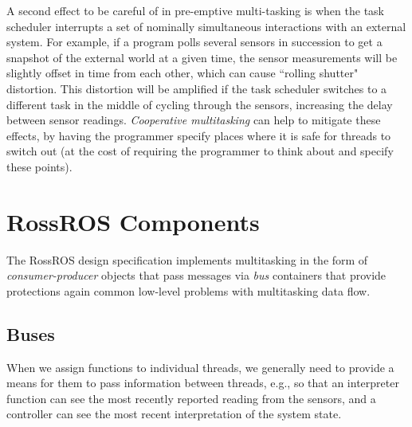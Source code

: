 \documentclass[11pt]{article}
\begin{document}
A second effect to be careful of in pre-emptive multi-tasking is when the task scheduler interrupts a set of nominally simultaneous interactions with an external system. For example, if a program polls several sensors in succession to get a snapshot of the external world at a given time, the sensor measurements will be slightly offset in time from each other, which can cause ``rolling shutter" distortion. This distortion will be amplified if the task scheduler switches to a different task in the middle of cycling through the sensors, increasing the delay between sensor readings. \emph{Cooperative multitasking} can help to mitigate these effects, by having the programmer specify places where it is safe for threads to switch out (at the cost of requiring the programmer to think about and specify these points).





\section{RossROS Components}

The RossROS design specification implements multitasking in the form of \emph{consumer-producer} objects that pass messages via \emph{bus} containers that provide protections again common low-level problems with multitasking data flow.

\subsection{Buses}
When we assign functions to individual threads, we generally need to provide a means for them to pass information between threads, e.g., so that an interpreter function can see the most recently reported reading from the sensors, and a controller can see the most recent interpretation of the system state. %
\end{document}
